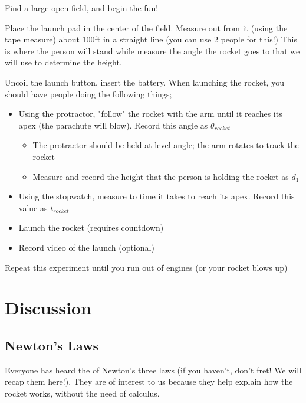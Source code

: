 \documentclass{article}
\begin{document}
Find a large open field, and begin the fun!

Place the launch pad in the center of the field.
Measure out from it (using the tape measure) about 100ft in a straight line (you can use 2 people for this!)
This is where the person will stand while measure the angle the rocket goes to that we will use to determine the height.

Uncoil the launch button, insert the battery.
When launching the rocket, you should have people doing the following things;
\begin{itemize}
	\item Using the protractor, "follow" the rocket with the arm until it reaches its apex (the parachute will blow). Record this angle as $\theta_{rocket}$
	\begin{itemize}
		\item The protractor should be held at level angle; the arm rotates to track the rocket
		\item Measure and record the height that the person is holding the rocket as $d_1$
	\end{itemize}
	\item Using the stopwatch, measure to time it takes to reach its apex. Record this value as $t_{rocket}$
	\item Launch the rocket (requires countdown)
	\item Record video of the launch (optional)
\end{itemize}

Repeat this experiment until you run out of engines (or your rocket blows up)

\section{Discussion}

\subsection{Newton's Laws}

Everyone has heard the of Newton's three laws (if you haven't, don't fret! We will recap them here!).
They are of interest to us because they help explain how the rocket works, without the need of calculus.
\end{document}
